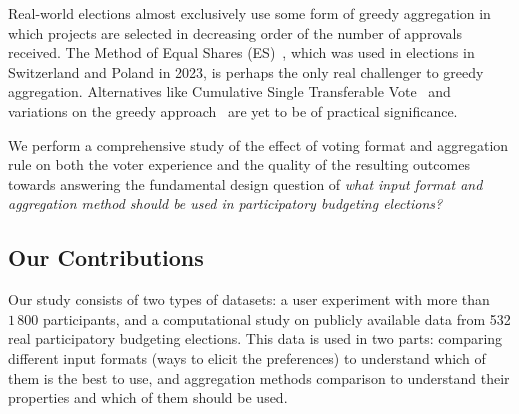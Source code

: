\documentclass[mnsc,blindrev]{informs3_freeuse} %
\newcommand{\mes}{ES}
\begin{document}

Real-world elections almost exclusively use some form of greedy aggregation in which projects are selected in decreasing order of the number of approvals   received. The Method of Equal Shares (\mes{})~\citep{peters2021proportional}, which was used in elections in Switzerland and Poland in 2023,  is perhaps the only real challenger to greedy aggregation.
Alternatives like Cumulative Single Transferable Vote~\citep{skowron2020participatory} and variations on the greedy approach~\citep{talmon2019framework}   are yet to be of practical significance.



We perform   a comprehensive  study of the effect of voting format and aggregation rule on  both the voter experience and the quality of the resulting outcomes    towards answering the fundamental design question of
\emph{what input format and aggregation method should be used  in participatory budgeting elections?
}

\subsection{Our Contributions}



Our study consists of two types of datasets: a user experiment    with more than $1\,800$ participants, and a computational study on publicly available data from 532  real participatory budgeting elections. This data is used in two parts: comparing different input formats (ways to elicit the preferences) to understand which of them is the best to use, and aggregation methods comparison to understand their properties and which of them should be used.
\end{document}

